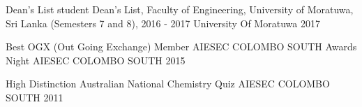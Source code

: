 



\begin{cvhonors}

  \cvhonor
    {Dean's List student} %
    {Dean’s List, Faculty of Engineering, University of Moratuwa, Sri Lanka (Semesters 7 and 8), 2016 - 2017} %
    {University Of Moratuwa} %
    {2017} %

  \cvhonor
    {Best OGX (Out Going Exchange) Member} %
    {AIESEC COLOMBO SOUTH Awards Night} %
    {AIESEC COLOMBO SOUTH} %
    {2015} %

  \cvhonor
    {High Distinction} %
    {Australian National Chemistry Quiz} %
    {AIESEC COLOMBO SOUTH} %
    {2011} %

\end{cvhonors}

